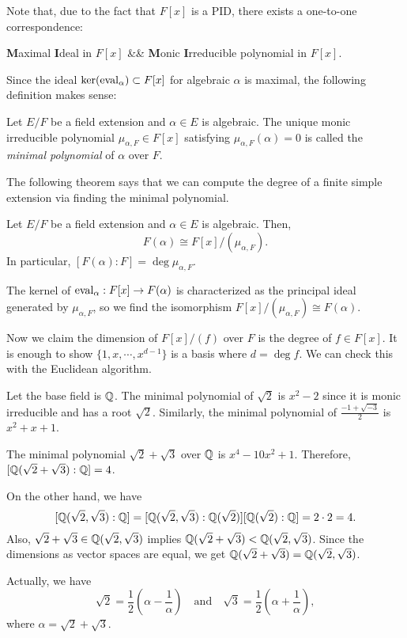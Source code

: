 \documentclass{../exp}
\begin{document}
Note that, due to the fact that $F[x]$ is a PID, there exists a one-to-one correspondence:
\begin{rd}
\textbf{M}aximal \textbf{I}deal in $F[x]$ &\quad& \textbf{M}onic \textbf{I}rreducible polynomial in $F[x]$. 
\end{rd}
Since the ideal $\ker(\operatorname{eval}_\alpha)\subset F[x]$ for algebraic $\alpha$ is maximal, the following definition makes sense:

\begin{defn}
Let $E/F$ be a field extension and $\alpha\in E$ is algebraic.
The unique monic irreducible polynomial $\mu_{\alpha,F}\in F[x]$ satisfying $\mu_{\alpha,F}(\alpha)=0$ is called the \emph{minimal polynomial} of $\alpha$ over $F$.
\end{defn}

The following theorem says that we can compute the degree of a finite simple extension via finding the minimal polynomial.
\begin{thm}
Let $E/F$ be a field extension and $\alpha\in E$ is algebraic.
Then,
\[F(\alpha)\cong F[x]/(\mu_{\alpha,F}).\]
In particular, $[F(\alpha):F]=\deg\mu_{\alpha,F}$.
\end{thm}
\begin{pf}
The kernel of $\eval_\alpha:F[x]\to F(\alpha)$ is characterized as the principal ideal generated by $\mu_{\alpha,F}$, so we find the isomorphism $F[x]/(\mu_{\alpha,F})\cong F(\alpha)$.

Now we claim the dimension of $F[x]/(f)$ over $F$ is the degree of $f\in F[x]$.
It is enough to show $\{1,x,\cdots,x^{d-1}\}$ is a basis where $d=\deg f$.
We can check this with the Euclidean algorithm.
\end{pf}

\begin{ex}
Let the base field is $\mathbb{Q}$.
The minimal polynomial of $\sqrt2$ is $x^2-2$ since it is monic irreducible and has a root $\sqrt2$.
Similarly, the minimal polynomial of $\frac{-1+\sqrt{-3}}2$ is $x^2+x+1$.
\end{ex}
\begin{ex}
The minimal polynomial $\sqrt2+\sqrt3$ over $\mathbb{Q}$ is $x^4-10x^2+1$.
Therefore, $[\mathbb{Q}(\sqrt2+\sqrt3):\mathbb{Q}]=4$.

On the other hand, we have
\[[\mathbb{Q}(\sqrt2,\sqrt3):\mathbb{Q}]=[\mathbb{Q}(\sqrt2,\sqrt3):\mathbb{Q}(\sqrt2)][\mathbb{Q}(\sqrt2):\mathbb{Q}]=2\cdot2=4.\]
Also, $\sqrt2+\sqrt3\in\mathbb{Q}(\sqrt2,\sqrt3)$ implies $\mathbb{Q}(\sqrt2+\sqrt3)<\mathbb{Q}(\sqrt2,\sqrt3)$.
Since the dimensions as vector spaces are equal, we get $\mathbb{Q}(\sqrt2+\sqrt3)=\mathbb{Q}(\sqrt2,\sqrt3)$.

Actually, we have
\[\sqrt2=\frac12\left(\alpha-\frac1\alpha\right)\quad\text{and}\quad\sqrt3=\frac12\left(\alpha+\frac1\alpha\right),\]
where $\alpha=\sqrt2+\sqrt3$.
\end{ex}
\end{document}
